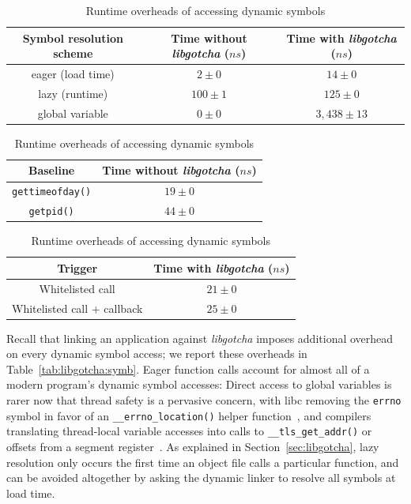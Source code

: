 

\begin{table}
	\begin{minipage}{2\columnwidth}
	\centering
	\begin{tabular}{c | c c}
	Symbol resolution scheme & Time without \textit{libgotcha} ($ns$) & Time with \textit{libgotcha} ($ns$) \\
	\hline
	eager (load time) & $2 \pm 0$ & $14 \pm 0$ \\
	lazy (runtime) & $100 \pm 1$ & $125 \pm 0$ \\
	global variable & $0 \pm 0$ & $3,438 \pm 13$
	\end{tabular}
	\label{tab:libgotcha:symb}
	\end{minipage}

	\begin{minipage}{\columnwidth}
	\centering
	\begin{tabular}{c | c}
	Baseline & Time without \textit{libgotcha} ($ns$) \\
	\hline
	\texttt{gettimeofday()} & $19 \pm 0$ \\
	\texttt{getpid()} & $44 \pm 0$
	\end{tabular}
	\label{tab:libgotcha:baseline}
	\end{minipage}
%
	\begin{minipage}{\columnwidth}
	\centering
	\begin{tabular}{c | c}
	Trigger & Time with \textit{libgotcha} ($ns$) \\
	\hline
	Whitelisted call & $21 \pm 0$ \\
	Whitelisted call + callback & $25 \pm 0$
	\end{tabular}
	\label{tab:libgotcha:whitelist}
	\end{minipage}
\caption{Runtime overheads of accessing dynamic symbols}
\end{table}

Recall that linking an application against \textit{libgotcha} imposes additional
overhead on every dynamic symbol access; we report these overheads in
Table~\ref{tab:libgotcha:symb}.  Eager function calls account for almost all of a
modern program's dynamic symbol accesses:  Direct access to global variables is rarer
now that thread safety is a pervasive concern, with libc removing the \texttt{errno}
symbol in favor of an \texttt{\_\_errno\_location()} helper
function~\cite{www-lsb-errno}, and compilers translating thread-local variable
accesses into calls to \texttt{\_\_tls\_get\_addr()} or offsets from a segment
register~\cite{drepper:spec2013}.  As explained in Section~\ref{sec:libgotcha}, lazy
resolution only occurs the first time an object file calls a particular function, and
can be avoided altogether by asking the dynamic linker to resolve all symbols at load
time.

